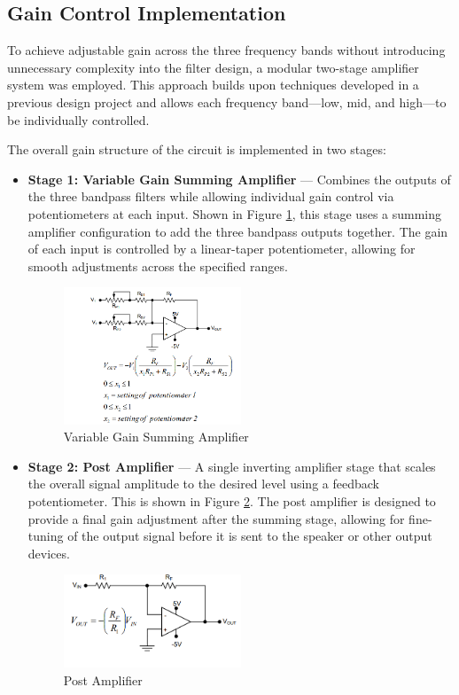 \documentclass[12pt]{article}
\begin{document}
\subsection{Gain Control Implementation}

To achieve adjustable gain across the three frequency bands without introducing unnecessary complexity into the filter design, a modular two-stage amplifier system was employed. This approach builds upon techniques developed in a previous design project and allows each frequency band—low, mid, and high—to be individually controlled.

The overall gain structure of the circuit is implemented in two stages:
\begin{itemize}
	\item \textbf{Stage 1: Variable Gain Summing Amplifier} — Combines the outputs of the three bandpass filters while allowing individual gain control via potentiometers at each input. Shown in Figure \ref{fig:summing}, this stage uses a summing amplifier configuration to add the three bandpass outputs together. The gain of each input is controlled by a linear-taper potentiometer, allowing for smooth adjustments across the specified ranges.
	      \begin{figure}[H]
		      \centering
		      \includegraphics[width=0.5\textwidth]{dp2summing}
		      \caption{Variable Gain Summing Amplifier}
		      \label{fig:summing}
	      \end{figure}
	\item \textbf{Stage 2: Post Amplifier} — A single inverting amplifier stage that scales the overall signal amplitude to the desired level using a feedback potentiometer. This is shown in Figure \ref{fig:postamp}. The post amplifier is designed to provide a final gain adjustment after the summing stage, allowing for fine-tuning of the output signal before it is sent to the speaker or other output devices.
	      \begin{figure}[H]
		      \centering
		      \includegraphics[width=0.5\textwidth]{dp2inverting.png}
		      \caption{Post Amplifier}
		      \label{fig:postamp}
	      \end{figure}
\end{itemize}
\end{document}

